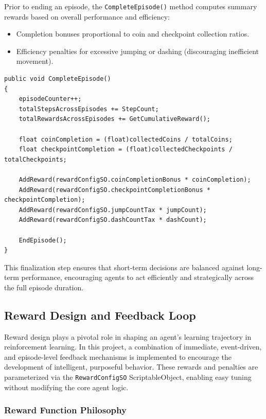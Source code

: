 \documentclass[12pt,oneside,openright,a4paper]{cpe-english-project}
\begin{document}
Prior to ending an episode, the \texttt{CompleteEpisode()} method computes summary rewards based on overall performance and efficiency:

\begin{itemize}
\item Completion bonuses proportional to coin and checkpoint collection ratios.
\item Efficiency penalties for excessive jumping or dashing (discouraging inefficient movement).
\end{itemize}

\begin{lstlisting}[language={[Sharp]C}]
public void CompleteEpisode()
{
	episodeCounter++;
	totalStepsAcrossEpisodes += StepCount;
	totalRewardsAcrossEpisodes += GetCumulativeReward();
	
	float coinCompletion = (float)collectedCoins / totalCoins;
	float checkpointCompletion = (float)collectedCheckpoints / totalCheckpoints;

	AddReward(rewardConfigSO.coinCompletionBonus * coinCompletion);
	AddReward(rewardConfigSO.checkpointCompletionBonus * checkpointCompletion);
	AddReward(rewardConfigSO.jumpCountTax * jumpCount);
	AddReward(rewardConfigSO.dashCountTax * dashCount);

	EndEpisode();
}
\end{lstlisting}

This finalization step ensures that short-term decisions are balanced against long-term performance, encouraging agents to act efficiently and strategically across the full episode duration.

\subsection{Reward Design and Feedback Loop}

Reward design plays a pivotal role in shaping an agent's learning trajectory in reinforcement learning. In this project, a combination of immediate, event-driven, and episode-level feedback mechanisms is implemented to encourage the development of intelligent, purposeful behavior. These rewards and penalties are parameterized via the \texttt{RewardConfigSO} ScriptableObject, enabling easy tuning without modifying the core agent logic.

\subsubsection{Reward Function Philosophy}
\end{document}

